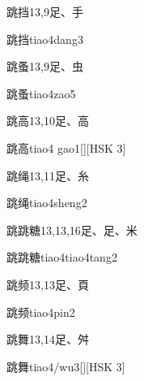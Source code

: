 \begin{Entry}{跳挡}{13,9}{⾜、⼿}
  \begin{Phonetics}{跳挡}{tiao4dang3}
  \end{Phonetics}
\end{Entry}

\begin{Entry}{跳蚤}{13,9}{⾜、⾍}
  \begin{Phonetics}{跳蚤}{tiao4zao5}
  \end{Phonetics}
\end{Entry}

\begin{Entry}{跳高}{13,10}{⾜、⾼}
  \begin{Phonetics}{跳高}{tiao4 gao1}[][HSK 3]
  \end{Phonetics}
\end{Entry}

\begin{Entry}{跳绳}{13,11}{⾜、⽷}
  \begin{Phonetics}{跳绳}{tiao4sheng2}
  \end{Phonetics}
\end{Entry}

\begin{Entry}{跳跳糖}{13,13,16}{⾜、⾜、⽶}
  \begin{Phonetics}{跳跳糖}{tiao4tiao4tang2}
  \end{Phonetics}
\end{Entry}

\begin{Entry}{跳频}{13,13}{⾜、⾴}
  \begin{Phonetics}{跳频}{tiao4pin2}
  \end{Phonetics}
\end{Entry}

\begin{Entry}{跳舞}{13,14}{⾜、⾇}
  \begin{Phonetics}{跳舞}{tiao4/wu3}[][HSK 3]
  \end{Phonetics}
\end{Entry}

